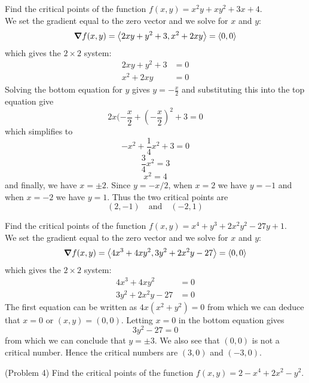 \documentclass[handout]{ximera}
\begin{document}
\begin{example}[Example 3]
Find the critical points of the function $f(x,y) = x^2y +xy^2 +3x + 4$.\\
We set the gradient equal to the zero vector and we solve for $x$ and $y$:
\[
\boldsymbol\nabla f(x,y) = \left\langle 2xy + y^2 + 3, x^2 + 2xy\right\rangle = \left\langle 0,0\right\rangle
\]
which gives the $2 \times 2$ system:
\begin{align*}
2xy + y^2 +3  &= 0\\
x^2 + 2xy & = 0
\end{align*}
Solving the bottom equation for $y$ gives $y = -\frac{x}{2}$ and substituting this into the top equation give
\[
2x(-\frac{x}{2} + \left(-\frac{x}{2}\right)^2 +3 = 0
\]
which simplifies to
\[
-x^2 + \frac14 x^2 + 3 =0
\]
\[
\frac34 x^2 = 3
\]
\[
x^2 = 4
\]
and finally, we have $x=\pm 2$. Since $y = -x/2$, when $x=2$ we have $y=-1$ and when $x = -2$ we have $y = 1$.
Thus the two critical points are
\[
(2,-1) \quad \text{and} \quad (-2, 1)
\]
\end{example}

\begin{example}[Example 4]
Find the critical points of the function $f(x,y) = x^4 + y^3 + 2x^2y^2 -27y + 1$.\\
We set the gradient equal to the zero vector and we solve for $x$ and $y$:
\[
\boldsymbol\nabla f(x,y) = \left\langle 4x^3 + 4xy^2, 3y^2 + 2x^2y -27\right\rangle = \left\langle 0,0\right\rangle
\]
which gives the $2 \times 2$ system:
\begin{align*}
4x^3 + 4xy^2 &= 0\\
3y^2 + 2x^2y -27& = 0
\end{align*}
The first equation can be written as $4x(x^2 + y^2) = 0$ from which we can deduce that $x = 0$ or $(x, y) = (0,0)$. Letting $x = 0$ in the bottom equation gives
\[
3y^2 - 27 = 0
\]
from which we can conclude that $y = \pm 3$. We also see that $(0,0)$ is not a critical number.
Hence the critical numbers are $(3,0)$ and $(-3,0)$.
\end{example}

\begin{problem}(Problem 4)
Find the critical points of the function $f(x,y) = 2-x^4 + 2x^2 - y^2$.
\end{problem}
\end{document}
